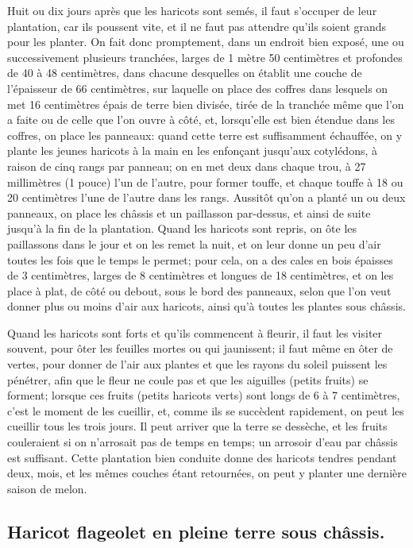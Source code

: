 \documentclass[10pt,a4paper]{book}
\begin{document}
Huit ou dix jours après que les haricots sont semés, il faut s'occuper de leur plantation, car ils poussent vite, et il ne faut pas attendre qu'ils soient grands pour les planter. On fait donc promptement, dans un endroit bien exposé, une ou successivement plusieurs tranchées, larges de 1 mètre 50 centimètres et profondes de 40 à 48 centimètres, dans chacune desquelles on établit une couche de l'épaisseur de 66 centimètres, sur laquelle on place des coffres dans lesquels on met 16 centimètres épais de terre bien divisée, tirée de la tranchée même que l'on a faite ou de celle que l'on ouvre à côté, et, lorsqu'elle est bien étendue dans les coffres, on place les panneaux: quand cette terre est suffisamment échauffée, on y plante les jeunes haricots à la main en les enfonçant jusqu'aux cotylédons, à raison de cinq rangs par panneau; on en met deux dans chaque trou, à 27 millimètres (1 pouce) l'un de l'autre, pour former touffe, et chaque touffe à 18 ou 20 centimètres l'une de l'autre dans les rangs. Aussitôt qu'on a planté un ou deux panneaux, on place les châssis et un paillasson par-dessus, et ainsi de suite jusqu'à la fin de la plantation. Quand les haricots sont repris, on ôte les paillassons dans le jour et on les remet la nuit, et on leur donne un peu d'air toutes les fois que le temps le permet; pour cela, on a des cales en bois épaisses de 3 centimètres, larges de 8 centimètres et longues de 18 centimètres, et on les place à plat, de côté ou debout, sous le bord des panneaux, selon que l'on veut donner plus ou moins d'air aux haricots, ainsi qu'à toutes les plantes sous châssis.

Quand les haricots sont forts et qu'ils commencent à fleurir, il faut les visiter souvent, pour ôter les feuilles mortes ou qui jaunissent; il faut même en ôter de vertes, pour donner de l'air aux plantes et que les rayons du soleil puissent les pénétrer, afin que le fleur ne coule pas et que les aiguilles (petits fruits) se forment; lorsque ces fruits (petits haricots verts) sont longs de 6 à 7 centimètres, c'est le moment de les cueillir, et, comme ils se succèdent rapidement, on peut les cueillir tous les trois jours. Il peut arriver que la terre se dessèche, et les fruits couleraient si on n'arrosait pas de temps en temps; un arrosoir d'eau par châssis est suffisant. Cette plantation bien conduite donne des haricots tendres pendant deux, mois, et les mêmes couches étant retournées, on peut y planter une dernière saison de melon.

\subsection{Haricot flageolet en pleine terre sous châssis.}
\end{document}
